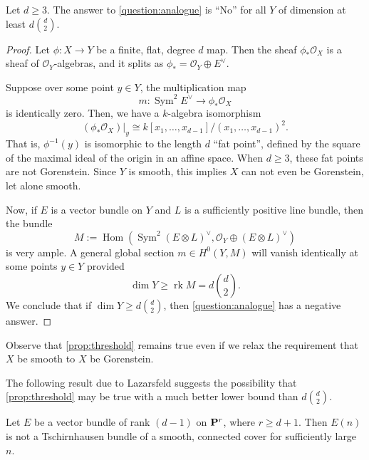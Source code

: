 \documentclass[11 pt]{amsart}
\renewcommand{\k}{k}
\renewcommand{\O}{{\mathcal O}}
\renewcommand {\P}{{\bf P}}
\providecommand {\from}{{\colon}}
\providecommand{\Hom}{\operatorname{Hom}}
\providecommand{\Sym}{\operatorname{Sym}}
\providecommand{\rk}{\operatorname{rk}}
\numberwithin{equation}{section}
\begin{document}
\begin{proposition}\label{prop:threshold}
  Let $d \geq 3$.
  The answer to \autoref{question:analogue} is ``No'' for all $Y$ of dimension at least $d {d \choose 2}$.
\end{proposition}
\begin{proof}
  Let $\phi \from X \to Y$ be a finite, flat, degree $d$ map.
  Then the sheaf $\phi_{*}\O_{X}$ is a sheaf of $\O_{Y}$-algebras, and it splits as $\phi_{*} = \O_{Y}\oplus E^{\vee}$.  
  
  Suppose over some point $y \in Y$, the multiplication map
  \[m : \Sym^{2}E^{\vee} \to \phi_{*}\O_{X}\]
  is identically zero.
  Then, we have a $k$-algebra isomorphism
  \[(\phi_{*}\O_{X})|_y \cong \k[x_{1}, \dots, x_{d-1}]/(x_{1}, \dots, x_{d-1})^{2}.\]
  That is, $\phi^{-1}(y)$ is isomorphic to the length $d$ ``fat point'', defined by the square of the maximal ideal of the origin in an affine space.
  When $d \geq 3$, these fat points are not Gorenstein.
  Since $Y$ is smooth, this implies $X$ can not even be Gorenstein, let alone smooth.
  
  Now, if $E$ is a vector bundle on $Y$ and $L$ is a sufficiently positive line bundle, then the bundle 
  \[M := \Hom(\Sym^{2}(E \otimes L)^{\vee}, \O_{Y} \oplus (E \otimes L)^{\vee})\]
  is very ample.
  A general global section $m \in H^{0}(Y, M)$ will vanish identically at some points $y \in Y$ provided 
  \[ \dim Y \geq \rk M = d {d \choose 2}.\]
  We conclude that if $\dim Y \geq d {d \choose 2}$, then \autoref{question:analogue} has a negative answer.
\end{proof}
Observe that \autoref{prop:threshold} remains true even if we relax the requirement that $X$ be smooth to $X$ be Gorenstein.

The following result due to Lazarsfeld suggests the possibility that \autoref{prop:threshold} may be true with a much better lower bound than $d { d \choose 2}$.
\begin{proposition}\label{prop:laz}
  Let $E$ be a vector bundle of rank $(d-1)$ on $\P^{r}$, where $r \geq d+1$.
  Then $E(n)$ is not a Tschirnhausen bundle of a smooth, connected cover for sufficiently large $n$.
\end{proposition}
\end{document}
